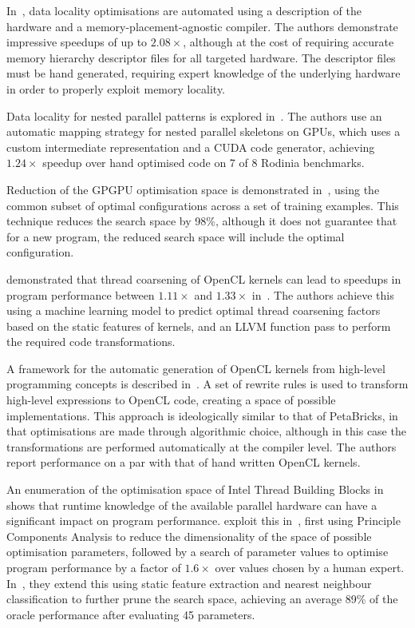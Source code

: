 In~\cite{Chen2014}, data locality optimisations are automated using a
description of the hardware and a memory-placement-agnostic
compiler. The authors demonstrate impressive speedups of up to
$2.08\times$, although at the cost of requiring accurate memory
hierarchy descriptor files for all targeted hardware. The descriptor
files must be hand generated, requiring expert knowledge of the
underlying hardware in order to properly exploit memory locality.

Data locality for nested parallel patterns is explored in~\cite{Lee}.
The authors use an automatic mapping strategy for nested parallel
skeletons on GPUs, which uses a custom intermediate representation and
a CUDA code generator, achieving $1.24\times$ speedup over hand
optimised code on 7 of 8 Rodinia benchmarks.

Reduction of the GPGPU optimisation space is demonstrated
in~\cite{Ryoo2008}, using the common subset of optimal configurations
across a set of training examples. This technique reduces the search
space by 98\%, although it does not guarantee that for a new program,
the reduced search space will include the optimal configuration.

\citeauthor{Magni2014} demonstrated that thread coarsening of OpenCL
kernels can lead to speedups in program performance between
$1.11\times$ and $1.33\times$ in~\cite{Magni2014}. The authors achieve
this using a machine learning model to predict optimal thread
coarsening factors based on the static features of kernels, and an
LLVM function pass to perform the required code transformations.

A framework for the automatic generation of OpenCL kernels from
high-level programming concepts is described in~\cite{Steuwer2015}. A
set of rewrite rules is used to transform high-level expressions to
OpenCL code, creating a space of possible implementations. This
approach is ideologically similar to that of PetaBricks, in that
optimisations are made through algorithmic choice, although in this
case the transformations are performed automatically at the compiler
level. The authors report performance on a par with that of hand
written OpenCL kernels.



An enumeration of the optimisation space of Intel Thread Building
Blocks in~\cite{Contreras2008} shows that runtime knowledge of the
available parallel hardware can have a significant impact on program
performance. \citeauthor{Collins2012} exploit this
in~\cite{Collins2012}, first using Principle Components Analysis to
reduce the dimensionality of the space of possible optimisation
parameters, followed by a search of parameter values to optimise
program performance by a factor of $1.6\times$ over values chosen by a
human expert. In~\cite{Collins2013}, they extend this using static
feature extraction and nearest neighbour classification to further
prune the search space, achieving an average 89\% of the oracle
performance after evaluating 45 parameters.

